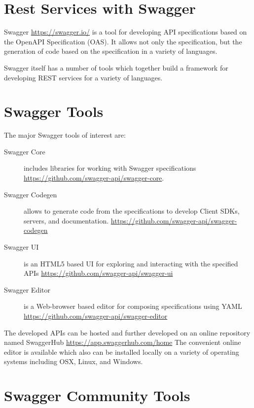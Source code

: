 

\section{Rest Services with Swagger}

Swagger \url{https://swagger.io/} is a tool for developing API
specifications based on the OpenAPI Specification (OAS). It allows not
only the specification, but the generation of code based on the
specification in a variety of languages.

Swagger itself has a number of tools which together build a framework
for developing REST services for a variety of languages.


\section{Swagger Tools}

The major Swagger tools of interest are:

\begin{description}

\item[Swagger Core] includes libraries for working with Swagger
 specifications \url{https://github.com/swagger-api/swagger-core}.

\item[Swagger Codegen] allows to generate code from the specifications
 to develop Client SDKs, servers, and documentation. \url{https://github.com/swagger-api/swagger-codegen}

\item[Swagger UI] is an HTML5 based UI for exploring and interacting
 with the specified APIs \url{https://github.com/swagger-api/swagger-ui}

\item[Swagger Editor] is a Web-browser based editor for composing 
 specifications using YAML \url{https://github.com/swagger-api/swagger-editor}

\end{description}

The developed APIs can be hosted and further developed on an
online repository named SwaggerHub \url{https://app.swaggerhub.com/home}
The convenient online editor is available which also can be installed
locally on a variety of operating systems including OSX, Linux, and
Windows. 

\section{Swagger Community Tools}

